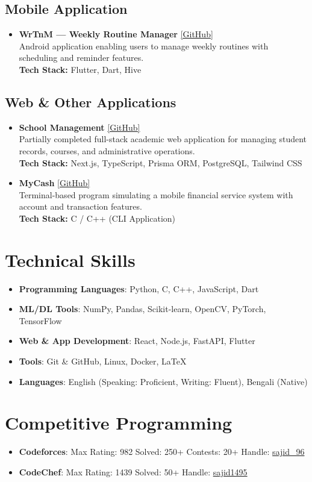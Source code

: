 \documentclass[letterpaper,11pt]{article}
\newcommand{\resumeItem}[2]{
  \item\small{
    \textbf{#1}{: #2 \vspace{-4pt}}
  }
}
\newcommand{\resumeSubItem}[2]{\resumeItem{#1}{#2}\vspace{-2pt}}
\newcommand{\projectItem}[4]{
  \item \small{
    \textbf{#1} \hfill #4 \\
    #2 \\
    \textbf{Tech Stack:} #3
    \vspace{-3pt}
  }
}
\newcommand{\resumeSubHeadingListStart}{\begin{itemize}[leftmargin=*]}
\newcommand{\resumeSubHeadingListEnd}{\end{itemize}\vspace{-5pt}}
\begin{document}
\vspace{6pt}

\subsection{Mobile Application}
\resumeSubHeadingListStart
  \projectItem
    {WrTnM — Weekly Routine Manager}
    {Android application enabling users to manage weekly routines with scheduling and reminder features.}
    {Flutter, Dart, Hive}
    {\href{https://github.com/sajidruetcse21/Weekly-Routine-Manager}{[GitHub]}}
\resumeSubHeadingListEnd

\vspace{6pt}

\subsection{Web \& Other Applications}
\resumeSubHeadingListStart
  \projectItem
    {School Management}
    {Partially completed full-stack academic web application for managing student records, courses, and administrative operations.}
    {Next.js, TypeScript, Prisma ORM, PostgreSQL, Tailwind CSS}
    {\href{https://github.com/sajidruetcse21/School-Management}{[GitHub]}}

  \projectItem
    {MyCash}
    {Terminal-based program simulating a mobile financial service system with account and transaction features.}
    {C / C++ (CLI Application)}
    {\href{https://github.com/sajidruetcse21/myCash}{[GitHub]}}
\resumeSubHeadingListEnd

\section{Technical Skills}
\resumeSubHeadingListStart
  \resumeSubItem{Programming Languages}{Python, C, C++, JavaScript, Dart}
  \resumeSubItem{ML/DL Tools}{NumPy, Pandas, Scikit-learn, OpenCV, PyTorch, TensorFlow}
  \resumeSubItem{Web \& App Development}{React, Node.js, FastAPI, Flutter}
  \resumeSubItem{Tools}{Git \& GitHub, Linux, Docker, LaTeX}
  \resumeSubItem{Languages}{English (Speaking: Proficient, Writing: Fluent), Bengali (Native)}
\resumeSubHeadingListEnd

\section{Competitive Programming}
\resumeSubHeadingListStart
  \resumeSubItem{Codeforces}{Max Rating: 982 \textbar{} Solved: 250+ \textbar{} Contests: 20+ \textbar{} Handle: \href{https://codeforces.com/profile/SaJiD_96}{sajid\_96}}
  \resumeSubItem{CodeChef}{Max Rating: 1439 \textbar{} Solved: 50+ \textbar{} Handle: \href{https://www.codechef.com/users/sajid1495}{sajid1495}}
\resumeSubHeadingListEnd
\end{document}
